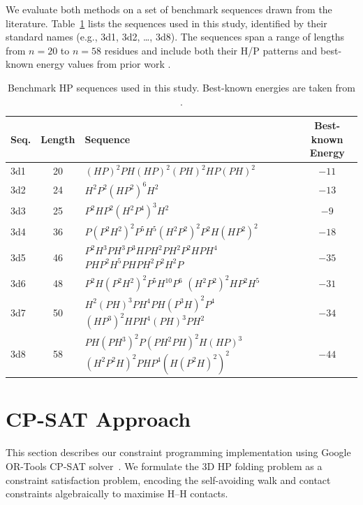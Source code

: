\documentclass[12pt, oneside, openany]{book}
\theoremstyle{plain}
\theoremstyle{definition}
\begin{document}
We evaluate both methods on a set of benchmark sequences drawn from the literature. Table~\ref{tab:benchmarks} lists the sequences used in this study, identified by their standard names (e.g., 3d1, 3d2, \ldots, 3d8). The sequences span a range of lengths from $n = 20$ to $n = 58$ residues and include both their H/P patterns and best-known energy values from prior work \cite{Espitia2024}.

\begin{table}[htbp]
\centering
\caption{Benchmark HP sequences used in this study. Best-known energies are taken from \cite{Espitia2024}.}
\label{tab:benchmarks}
\begin{tabular}{lc>{\centering\arraybackslash}p{6.8cm}c}
\toprule
\textbf{Seq.} & \textbf{Length} & \textbf{Sequence} & \textbf{Best-known Energy} \\
\midrule
3d1 & 20 & $(HP)^2PH(HP)^2(PH)^2HP(PH)^2$ & $-11$ \\
3d2 & 24 & $H^2P^2(HP^2)^6H^2$ & $-13$ \\
3d3 & 25 & $P^2HP^2(H^2P^4)^3H^2$ & $-9$ \\
3d4 & 36 & $P(P^2H^2)^2P^5H^5(H^2P^2)^2P^2H(HP^2)^2$ & $-18$ \\
3d5 & 46 & $P^2H^3PH^3P^3HPH^2PH^2P^2HPH^4$ \newline $PHP^2H^5PHPH^2P^2H^2P$ & $-35$ \\
3d6 & 48 & $P^2H(P^2H^2)^2P^5H^{10}P^6$ \newline $(H^2P^2)^2HP^2H^5$ & $-31$ \\
3d7 & 50 & $H^2(PH)^3PH^4PH(P^3H)^2P^4$ \newline $(HP^3)^2HPH^4(PH)^3PH^2$ & $-34$ \\
3d8 & 58 & $PH(PH^3)^2P(PH^2PH)^2H(HP)^3$ \newline $(H^2P^2H)^2PHP^4(H(P^2H)^2)^2$ & $-44$ \\
\bottomrule
\end{tabular}
\end{table}

\newpage{}

\section{CP-SAT Approach}
\label{sec:cpsat_approach}

This section describes our constraint programming implementation using Google OR-Tools CP-SAT solver~\cite{GoogleORTools, Perron2023}. We formulate the 3D HP folding problem as a constraint satisfaction problem, encoding the self-avoiding walk and contact constraints algebraically to maximise H--H contacts.
\end{document}
